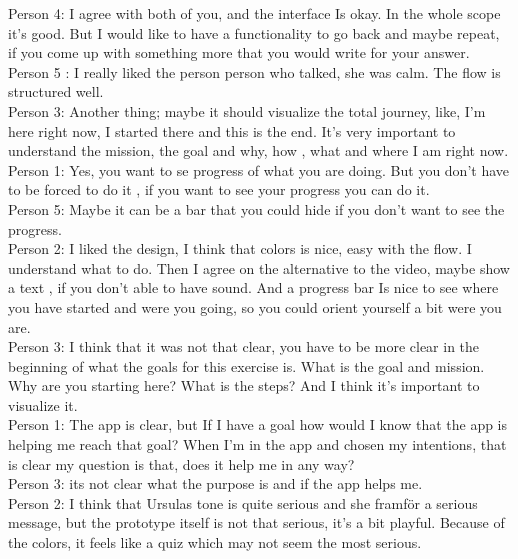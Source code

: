 Person 4:  I agree with both of you,  and the interface Is okay.  In the whole scope it’s good. But I would like to have a functionality to go back and maybe repeat, if you come up with something more that you would write for your answer. \\

Person 5 : I really liked the person person who talked, she was calm.  The flow is structured well. \\

Person 3: Another thing; maybe it should visualize the total journey, like, I’m here right now, I started there and this is the end.  It’s very important to understand the mission, the goal and why, how , what and where I am right now. \\

Person 1: Yes, you want to se progress of what you are doing. But you don’t have to be forced to do it , if you want to see your progress you can do it. \\

Person 5: Maybe it can be a bar that you could hide if you don’t want to see the progress. \\ 

Person 2: I liked the design, I think that colors is nice, easy with the flow. I understand what to do. Then I agree on the alternative to the video, maybe show a text , if you don’t able to have sound. And a progress bar Is nice to see where you have started and were you going, so you could orient yourself a bit were you are. \\

Person 3: I think that it was not that clear, you have to be more clear in the beginning of what the goals for this exercise is. What is the goal and mission.  Why are you starting here? What is the steps? And I think it’s important to visualize it. \\ 

Person 1: The app is clear, but If I have a goal how would I know that the app is helping me reach that goal? When I’m in the app and chosen my intentions, that is clear my question is that, does it help me in any way? \\

Person 3: its not clear what the purpose is and if the app helps me. \\ 

Person 2: I think that Ursulas tone is quite serious and she framför a serious message, but the prototype itself is not that serious, it’s a bit playful.  Because of the colors, it feels like a quiz which may not seem the most serious. \\

